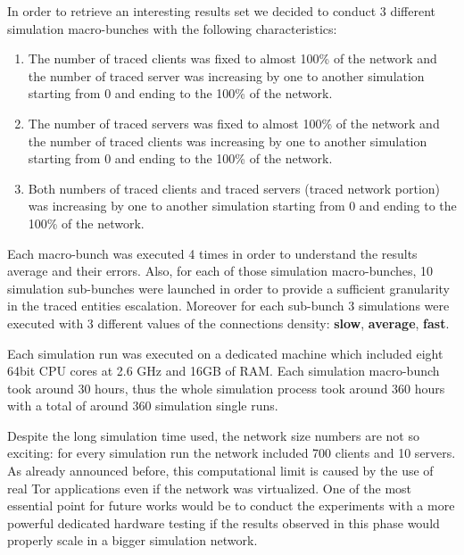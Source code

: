 In order to retrieve an interesting results set we decided to conduct
3 different simulation macro-bunches with the following characteristics:
\begin{enumerate}
	\item The number of traced clients was fixed to almost 100\% of the
network and the number of traced server was increasing by one to another
simulation starting from 0 and ending to the 100\% of the network.
	\item The number of traced servers was fixed to almost 100\% of the
network and the number of traced clients was increasing by one to another
simulation starting from 0 and ending to the 100\% of the network.
	\item Both numbers of traced clients and traced servers (traced
network portion) was increasing by one to another
simulation starting from 0 and ending to the 100\% of the network.
\end{enumerate}

Each macro-bunch was executed 4 times in order to understand the results
average and their errors. 
Also, for each of those simulation macro-bunches, 10 simulation sub-bunches were
launched in order to provide a sufficient granularity in the traced
entities escalation. Moreover for each sub-bunch 3 simulations were
executed with 3 different values of the connections density: \textbf{slow},
\textbf{average}, \textbf{fast}. 

Each simulation run was executed on a dedicated machine which included
 eight 64bit CPU cores at 2.6 GHz and 16GB of RAM. Each simulation
macro-bunch took around 30 hours, thus the whole simulation process took
around 360 hours with a total of around 360 simulation single runs.

Despite the long simulation time used, the network size numbers are not
so exciting: for every simulation run the network included 700 clients
and 10 servers. As already announced before, this computational limit is
caused by the use of real Tor applications even if the network was
virtualized. One of the most essential point for future works would be to
conduct the experiments with a more powerful dedicated hardware testing
if the results observed in this phase would properly scale in a bigger
simulation network. 

